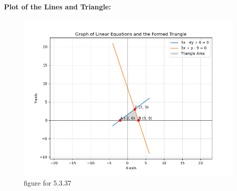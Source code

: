 \documentclass[journal]{IEEEtran}
\begin{document}
\textbf{Plot of the Lines and Triangle:}
\begin{figure}[H]
    \centering
    \includegraphics[width=1.1\columnwidth]{figs/fig1.png}
    \caption{figure for 5.3.37}
    \label{fig:triangle}
\end{figure}
\end{document}
